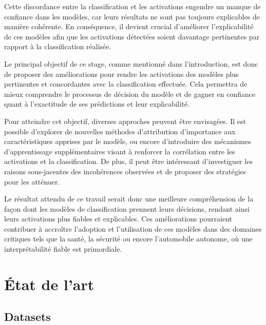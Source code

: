\documentclass{report}
\begin{document}
{\hspace{1.6cm}Cette discordance entre la classification et les activations engendre un manque de confiance dans les modèles, car leurs résultats ne sont pas toujours explicables de manière cohérente. En conséquence, il devient crucial d'améliorer l'explicabilité de ces modèles afin que les activations détectées soient davantage pertinentes par rapport à la classification réalisée.
\vspace*{0.5\baselineskip}

\hspace{1.6cm}Le principal objectif de ce stage, comme mentionné dans l'introduction, est donc de proposer des améliorations pour rendre les activations des modèles plus pertinentes et concordantes avec la classification effectuée. Cela permettra de mieux comprendre le processus de décision du modèle et de gagner en confiance quant à l'exactitude de ses prédictions et leur explicabilité.
\vspace*{0.5\baselineskip}

\hspace{1.6cm}Pour atteindre cet objectif, diverses approches peuvent être envisagées. Il est possible d'explorer de nouvelles méthodes d'attribution d'importance aux caractéristiques apprises par le modèle, ou encore d'introduire des mécanismes d'apprentissage supplémentaires visant à renforcer la corrélation entre les activations et la classification. De plus, il peut être intéressant d'investiguer les raisons sous-jacentes des incohérences observées et de proposer des stratégies pour les atténuer.
\newpage

\hspace{1.6cm}Le résultat attendu de ce travail serait donc une meilleure compréhension de la façon dont les modèles de classification prennent leurs décisions, rendant ainsi leurs activations plus fiables et explicables. Ces améliorations pourraient contribuer à accroître l'adoption et l'utilisation de ces modèles dans des domaines critiques tels que la santé, la sécurité ou encore l'automobile autonome, où une interprétabilité fiable est primordiale.

\chapter{État de l'art}

\section{Datasets}
}
\end{document}

